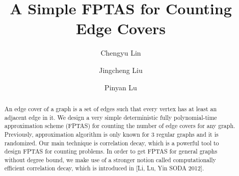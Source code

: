 \documentclass[a4paper,11pt]{article}
\title{A Simple FPTAS for Counting Edge Covers}
\begin{document}
\author{Chengyu Lin
	\and
	Jingcheng Liu
	\and
	Pinyan Lu
}
\maketitle
\begin{abstract}
An edge cover of a graph is a set of edges such that every vertex has at least an adjacent edge in it. We design a very simple deterministic fully polynomial-time approximation scheme  (FPTAS) for counting the number of edge covers for any graph. Previously, approximation algorithm is only known for 3 regular graphs and it is randomized. Our main technique is correlation decay, which is a powerful tool to design FPTAS for counting problems. In order to get FPTAS for general graphs without degree bound, we make use of a stronger notion called computationally efficient correlation decay, which is introduced in [Li, Lu, Yin SODA 2012].  
\end{abstract}
















\end{document}

